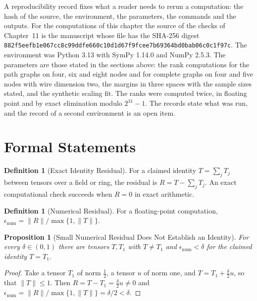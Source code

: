 \documentclass[11pt,letterpaper]{report}
\theoremstyle{plain}
\newtheorem{proposition}[theorem]{Proposition}
\theoremstyle{definition}
\newtheorem{definition}[theorem]{Definition}
\theoremstyle{remark}
\begin{document}
A reproducibility record fixes what a reader needs to rerun a computation: the hash of the source, the environment, the parameters, the commands and the outputs. For the computations of this chapter the source of the checks of Chapter~11 is the manuscript whose file has the SHA-256 digest \texttt{882f5eef\allowbreak b1e067cc\allowbreak 8c99ddfe\allowbreak 660c10d1\allowbreak d67f9fce\allowbreak e7b69364\allowbreak bd0bab06\allowbreak c0c1f97c}. The environment was Python 3.13 with SymPy 1.14.0 and NumPy 2.5.3. The parameters are those stated in the sections above: the rank computations for the path graphs on four, six and eight nodes and for complete graphs on four and five nodes with wire dimension two, the margins in three spaces with the sample sizes stated, and the synthetic scaling fit. The ranks were computed twice, in floating point and by exact elimination modulo $2^{31}-1$. The records state what was run, and the record of a second environment is an open item.

\section{Formal Statements}

\begin{definition}[Exact Identity Residual]\label{def:exactres}
For a claimed identity $T=\sum_jT_j$ between tensors over a field or ring, the residual is $R=T-\sum_jT_j$. An exact computational check succeeds when $R=0$ in exact arithmetic.
\end{definition}

\begin{definition}[Numerical Residual]\label{def:numres}
For a floating-point computation, $\epsilon_{\mathrm{num}}=\|R\|/\max\{1,\|T\|\}$.
\end{definition}

\begin{proposition}[Small Numerical Residual Does Not Establish an Identity]\label{pr:numres}
For every $\delta\in(0,1)$ there are tensors $T,T_1$ with $T\ne T_1$ and $\epsilon_{\mathrm{num}}<\delta$ for the claimed identity $T=T_1$.
\end{proposition}
\begin{proof}
Take a tensor $T_1$ of norm $\tfrac12$, a tensor $u$ of norm one, and $T=T_1+\tfrac\delta2u$, so that $\|T\|\le1$. Then $R=T-T_1=\tfrac\delta2u\ne0$ and $\epsilon_{\mathrm{num}}=\|R\|/\max\{1,\|T\|\}=\delta/2<\delta$.
\end{proof}
\end{document}
